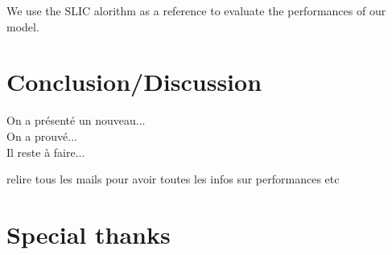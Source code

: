\documentclass{article}
\begin{document}
        \noindent We use the SLIC alorithm as a reference to evaluate the performances of our model.



\section{Conclusion/Discussion}
On a présenté un nouveau...\\
On a prouvé...\\
Il reste à faire...

relire tous les mails pour avoir toutes les infos sur performances etc

\section*{Special thanks}




\cite{shi_2000}
\cite{arbelaez_2011}
\cite{ren_2005}
\cite{felzenszwalb_2004}
\cite{chang_2019}
\cite{zitnick_2007}
\cite{fulkerson_2009}
\cite{stutz_2017}
\end{document}

